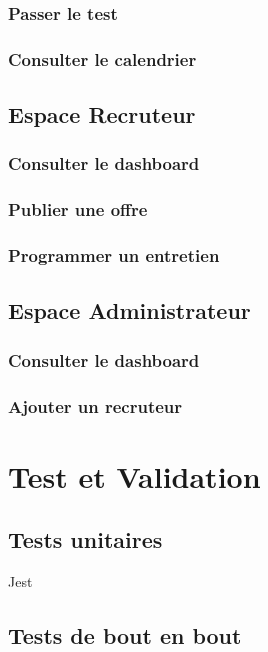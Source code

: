 \subsubsection{Passer le test}


\subsubsection{Consulter le calendrier}


\subsection{Espace Recruteur}
\subsubsection{Consulter le dashboard}

\subsubsection{Publier une offre}

\subsubsection{Programmer un entretien}


\subsection{Espace Administrateur}

\subsubsection{Consulter le dashboard}

\subsubsection{Ajouter un recruteur}

\section{Test et Validation}
\subsection{Tests unitaires}
Jest

\subsection{Tests de bout en bout}
